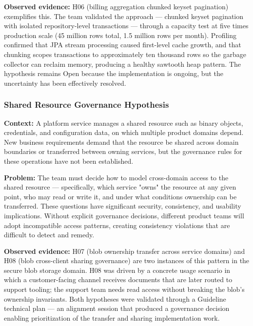 \textbf{Observed evidence:} H06 (billing aggregation chunked keyset pagination)
exemplifies this. The team validated the approach — chunked keyset pagination
with isolated repository-level transactions — through a capacity test at five
times production scale (45 million rows total, 1.5 million rows per month).
Profiling confirmed that JPA stream processing caused first-level cache growth,
and that chunking scopes transactions to approximately ten thousand rows so the
garbage collector can reclaim memory, producing a healthy sawtooth heap pattern.
The hypothesis remains Open because the implementation is ongoing, but the
uncertainty has been effectively resolved.

\subsubsection{Shared Resource Governance Hypothesis}
\label{subsubsec:pattern-b5}
\textbf{Context:} A platform service manages a shared resource such as binary objects,
credentials, and configuration data, on which multiple product domains depend. New
business requirements demand that the resource be shared across domain boundaries
or transferred between owning services, but the governance rules for these
operations have not been established.

\textbf{Problem:} The team must decide how to model cross-domain access to the
shared resource — specifically, which service "owns" the resource at any given
point, who may read or write it, and under what conditions ownership can be
transferred. These questions have significant security, consistency, and usability
implications. Without explicit governance decisions, different product teams will
adopt incompatible access patterns, creating consistency violations that are
difficult to detect and remedy.

\textbf{Observed evidence:} H07 (blob ownership transfer across service domains)
and H08 (blob cross-client sharing governance) are two instances of this pattern
in the secure blob storage domain. H08 was driven by a concrete usage scenario
in which a customer-facing channel receives documents that are later routed to
support tooling; the support team needs read access without breaking the blob's ownership invariants. 
Both hypotheses were validated through a Guideline technical plan — an alignment session that produced a governance decision enabling
prioritization of the transfer and sharing implementation work.

